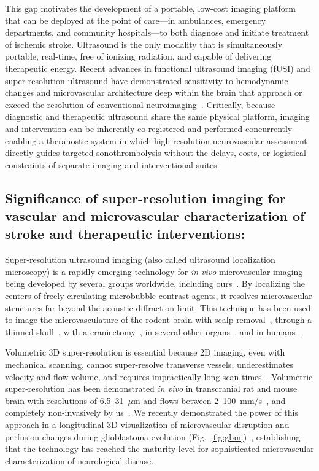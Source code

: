 This gap motivates the development of a portable, low-cost imaging platform that can be deployed at the point of care---in ambulances, emergency departments, and community hospitals---to both diagnose and initiate treatment of ischemic stroke. Ultrasound is the only modality that is simultaneously portable, real-time, free of ionizing radiation, and capable of delivering therapeutic energy. Recent advances in functional ultrasound imaging (fUSI) and super-resolution ultrasound have demonstrated sensitivity to hemodynamic changes and microvascular architecture deep within the brain that approach or exceed the resolution of conventional neuroimaging~\cite{demene2017functional,rabut20194d,mccall2023non}. Critically, because diagnostic and therapeutic ultrasound share the same physical platform, imaging and intervention can be inherently co-registered and performed concurrently---enabling a theranostic system in which high-resolution neurovascular assessment directly guides targeted sonothrombolysis without the delays, costs, or logistical constraints of separate imaging and interventional suites.

\subsection{Significance of super-resolution imaging for vascular and microvascular characterization of stroke and therapeutic interventions:}
Super-resolution ultrasound imaging (also called ultrasound localization microscopy) is a rapidly emerging technology for \textit{in vivo} microvascular imaging being developed by several groups worldwide, including ours~\cite{christensen2020super}. By localizing the centers of freely circulating microbubble contrast agents, it resolves microvascular structures far beyond the acoustic diffraction limit. This technique has been used to image the microvasculature of the rodent brain with scalp removal~\cite{renaudin2022functional}, through a thinned skull~\cite{errico2015ultrafast}, with a craniectomy~\cite{milecki2021deep}, in several other organs~\cite{christensen2014vivo,foiret2017ultrasound,song2017improved,huang2020short,lin20173,lowerison2020ultrasound}, and in humans~\cite{demene2021transcranial}.

Volumetric 3D super-resolution is essential because 2D imaging, even with mechanical scanning, cannot super-resolve transverse vessels, underestimates velocity and flow volume, and requires impractically long scan times~\cite{chavignon20213d}. Volumetric super-resolution has been demonstrated \textit{in vivo} in transcranial rat and mouse brain with resolutions of 6.5--31~$\mu$m and flows between 2--100~mm/s~\cite{chavignon20213d,demeulenaere2022vivo,renaudin2022functional}, and completely non-invasively by us~\cite{mccall2023non}. We recently demonstrated the power of this approach in a longitudinal 3D visualization of microvascular disruption and perfusion changes during glioblastoma evolution (Fig.~\ref{fig:gbm})~\cite{mccall2023longitudinal}, establishing that the technology has reached the maturity level for sophisticated microvascular characterization of neurological disease.

